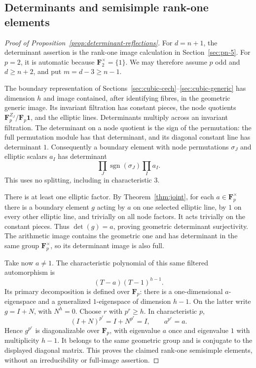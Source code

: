 \documentclass[11pt]{article}
\begin{document}
\subsection{Determinants and semisimple rank-one elements}
\begin{proof}[Proof of Proposition~\ref{prop:determinant-reflections}]
For $d=n+1$, the determinant assertion is the rank-one image calculation in Section~\ref{sec:pn-5}. For $p=2$, it is automatic because $\mathbf F_2^\times=\{1\}$. We may therefore assume $p$ odd and $d\ge n+2$, and put $m=d-3\ge n-1$.

The boundary representation of Sections~\ref{sec:cubic-cech}--\ref{sec:cubic-generic} has dimension $h$ and image contained, after identifying fibres, in the geometric generic image. Its invariant filtration has constant pieces, the node quotients $\mathbf F_p^{Z_J}/\mathbf F_p\mathbf1$, and the elliptic lines. Determinants multiply across an invariant filtration. The determinant on a node quotient is the sign of the permutation: the full permutation module has that determinant, and its diagonal constant line has determinant $1$. Consequently a boundary element with node permutations $\sigma_J$ and elliptic scalars $a_I$ has determinant
\[
\prod_J\operatorname{sgn}(\sigma_J)\prod_I a_I.
\]
This uses no splitting, including in characteristic $3$.

There is at least one elliptic factor. By Theorem~\ref{thm:joint}, for each $a\in\mathbf F_p^\times$ there is a boundary element $g$ acting by $a$ on one selected elliptic line, by $1$ on every other elliptic line, and trivially on all node factors. It acts trivially on the constant pieces. Thus $\det(g)=a$, proving geometric determinant surjectivity. The arithmetic image contains the geometric one and has determinant in the same group $\mathbf F_p^\times$, so its determinant image is also full.

Take now $a\ne1$. The characteristic polynomial of this same filtered automorphism is
\[
(T-a)(T-1)^{h-1}.
\]
Its primary decomposition is defined over $\mathbf F_p$: there is a one-dimensional $a$-eigenspace and a generalized $1$-eigenspace of dimension $h-1$. On the latter write $g=I+N$, with $N^h=0$. Choose $r$ with $p^r\ge h$. In characteristic $p$,
\[
(I+N)^{p^r}=I+N^{p^r}=I,
\qquad a^{p^r}=a.
\]
Hence $g^{p^r}$ is diagonalizable over $\mathbf F_p$, with eigenvalue $a$ once and eigenvalue $1$ with multiplicity $h-1$. It belongs to the same geometric group and is conjugate to the displayed diagonal matrix. This proves the claimed rank-one semisimple elements, without an irreducibility or full-image assertion.
\end{proof}
\end{document}
